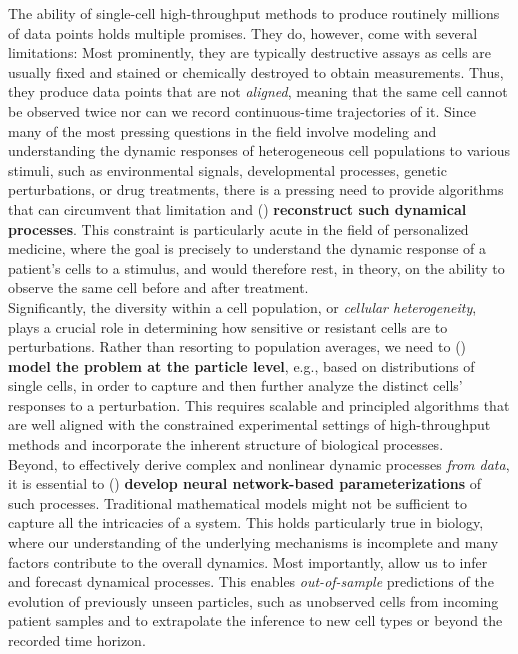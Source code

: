 The ability of single-cell high-throughput methods to produce routinely millions of data points holds multiple promises. They do, however, come with several limitations: 
 Most prominently, they are typically destructive assays as cells are usually fixed and stained or chemically destroyed to obtain measurements. Thus, they produce data points that are not \textit{aligned}, meaning that the same cell cannot be observed twice nor can we record continuous-time trajectories of it.
Since many of the most pressing questions in the field involve modeling and understanding the dynamic responses of heterogeneous cell populations to various stimuli, such as environmental signals, developmental processes, genetic perturbations, or drug treatments, there is a pressing need to provide algorithms that can circumvent that limitation and () \textbf{reconstruct such dynamical processes}. 
This constraint is particularly acute in the field of personalized medicine, where the goal is precisely to understand the dynamic response of a patient's cells to a stimulus, and would therefore rest, in theory, on the ability to observe the same cell before and after treatment. \\

Significantly, the diversity within a cell population, or \textit{cellular heterogeneity}, plays a crucial role in determining how sensitive or resistant cells are to perturbations.
Rather than resorting to population averages, we need to () \textbf{model the problem at the particle level}, e.g., based on distributions of single cells, in order to capture and then further analyze the distinct cells' responses to a perturbation. 
This requires scalable and principled algorithms that are well aligned with the constrained experimental settings of high-throughput methods and incorporate the inherent structure of biological processes. \\

Beyond, to effectively derive complex and nonlinear dynamic processes \textit{from data}, it is essential to () \textbf{develop neural network-based parameterizations} of such processes.
Traditional mathematical models might not be sufficient to capture all the intricacies of a system. This holds particularly true in biology, where our understanding of the underlying mechanisms is incomplete and many factors contribute to the overall dynamics.
Most importantly,  allow us to infer and forecast dynamical processes. This enables \emph{out-of-sample} predictions of the evolution of previously unseen particles, such as unobserved cells from incoming patient samples and to extrapolate the inference to new cell types or beyond the recorded time horizon. \\


